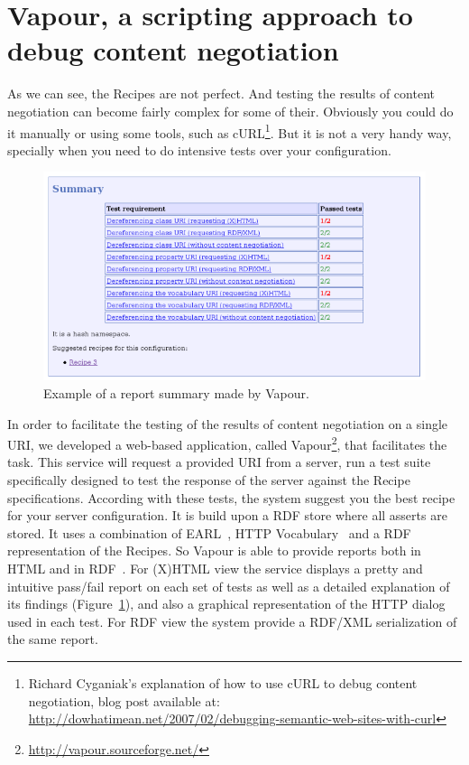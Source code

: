 
\section{\label{sec:vapour}Vapour, a scripting approach to debug content negotiation} 

As we can see, the Recipes are not perfect. And testing the results of content 
negotiation can become fairly complex for some of their. Obviously you could do 
it manually or using some tools, such as 
cURL\footnote{Richard Cyganiak's explanation of how to use cURL to debug content negotiation, 
blog post available at: \url{http://dowhatimean.net/2007/02/debugging-semantic-web-sites-with-curl}}.
But it is not a very handy way, specially when you need to do intensive tests over your 
configuration.

\begin{figure}
 \centering
 \includegraphics[width=12cm]{images/report-summary.png}
 \caption{\label{fig:report-summary}Example of a report summary made by Vapour.}
\end{figure}

In order to facilitate the testing of the results of content negotiation on a single 
URI, we developed a web-based application, called Vapour\footnote{\url{http://vapour.sourceforge.net/}}, 
that facilitates the task. This service will request a provided URI from a server, 
run a test suite specifically designed to test the response of the server against 
the Recipe specifications. According with these tests, the system suggest you the 
best recipe for your server configuration. It is build upon a RDF store %
where all asserts are stored. It uses a combination of EARL~\cite{EARL}, HTTP
Vocabulary~\cite{Koch2007} and a RDF representation of the Recipes. So Vapour 
is able to provide reports both in HTML and in RDF~\cite{RDF}. For (X)HTML view 
the service displays a pretty and intuitive pass/fail report on each set of tests 
as  well as a detailed explanation of its  findings (Figure~\ref{fig:report-summary}), 
and also a graphical representation of the HTTP dialog used in each test.
For RDF view %
the system provide a RDF/XML serialization of the same report.

